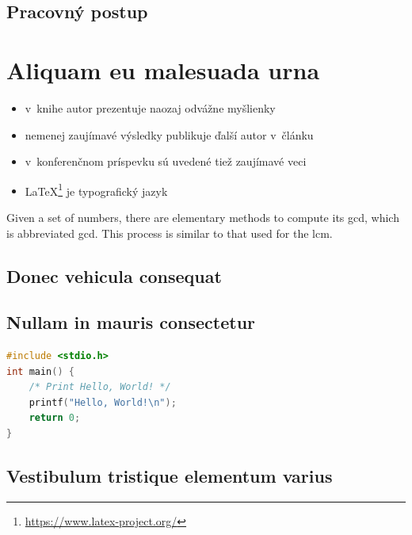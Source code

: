 \subsection{Pracovný postup}




\section{Aliquam eu malesuada urna}

\begin{itemize}
    \item v~knihe \cite{book} autor prezentuje naozaj odvážne myšlienky
    \item nemenej zaujímavé výsledky publikuje ďalší autor v~článku \cite{article} 
    \item v~konferenčnom príspevku \cite{conference} sú uvedené tiež zaujímavé veci
    \item \LaTeX{}\footnote{\url{https://www.latex-project.org/}} je typografický jazyk
\end{itemize}

Given a set of numbers, there are elementary methods to compute its \acrlong{gcd}, which is abbreviated \acrshort{gcd}. This process is similar to that used for the \acrfull{lcm}.

\subsection{Donec vehicula consequat}
\blindtext



\subsection{Nullam in mauris consectetur}
\blindtext

\begin{lstlisting}[language=C,caption={Program, ktorý pozdraví celý svet}]
#include <stdio.h>
int main() {
    /* Print Hello, World! */
    printf("Hello, World!\n");
    return 0;
}
\end{lstlisting}


\subsection{Vestibulum tristique elementum varius}
\blindtext

